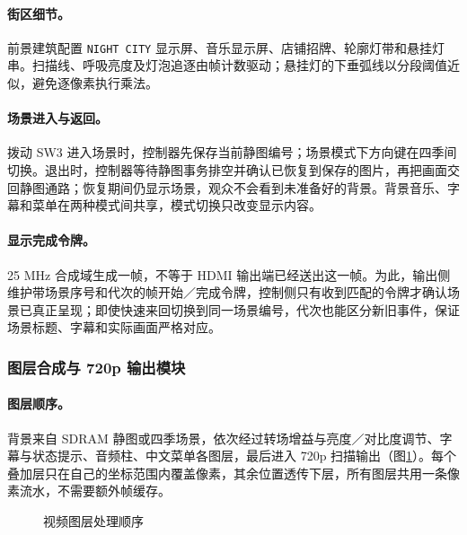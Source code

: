 \paragraph{街区细节。}前景建筑配置 \texttt{NIGHT CITY} 显示屏、音乐显示屏、店铺招牌、轮廓灯带和悬挂灯串。扫描线、呼吸亮度及灯泡追逐由帧计数驱动；悬挂灯的下垂弧线以分段阈值近似，避免逐像素执行乘法。

\paragraph{场景进入与返回。}拨动 SW3 进入场景时，控制器先保存当前静图编号；场景模式下方向键在四季间切换。退出时，控制器等待静图事务排空并确认已恢复到保存的图片，再把画面交回静图通路；恢复期间仍显示场景，观众不会看到未准备好的背景。背景音乐、字幕和菜单在两种模式间共享，模式切换只改变显示内容。

\paragraph{显示完成令牌。}25 MHz 合成域生成一帧，不等于 HDMI 输出端已经送出这一帧。为此，输出侧维护带场景序号和代次的帧开始／完成令牌，控制侧只有收到匹配的令牌才确认场景已真正呈现；即使快速来回切换到同一场景编号，代次也能区分新旧事件，保证场景标题、字幕和实际画面严格对应。

\subsubsection{图层合成与 720p 输出模块}
\paragraph{图层顺序。}背景来自 SDRAM 静图或四季场景，依次经过转场增益与亮度／对比度调节、字幕与状态提示、音频柱、中文菜单各图层，最后进入 720p 扫描输出（图\ref{fig:layers}）。每个叠加层只在自己的坐标范围内覆盖像素，其余位置透传下层，所有图层共用一条像素流水，不需要额外帧缓存。

\begin{figure}[H]\centering
{}
\caption{视频图层处理顺序}\label{fig:layers}
\end{figure}

